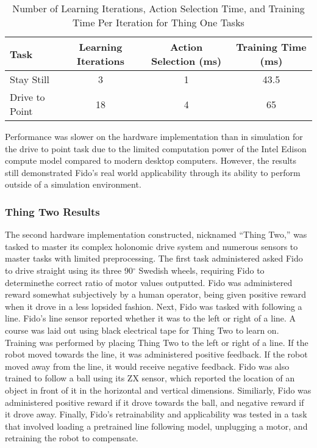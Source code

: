 \begin{table}[ht]
	\centering
	\begin{tabular}{@{}lccc@{}}
		\toprule
		Task             & Learning Iterations & Action Selection (ms) & Training Time (ms) \\ \midrule
		Stay Still       & 3                   & 1                    & 43.5                  \\
		Drive to Point   & 18                  & 4                     & 65                  \\
	\end{tabular}
	\caption{Number of Learning Iterations, Action Selection Time, and Training Time Per Iteration for Thing One Tasks}
	\label{tab:data2}
\end{table}

Performance was slower on the hardware implementation than in simulation for the drive to point task due to the limited computation power of the Intel Edison compute model compared to modern desktop computers.
However, the results still demonstrated Fido's real world applicability through its ability to perform outside of a simulation environment.

\subsubsection{Thing Two Results}

The second hardware implementation constructed, nicknamed ``Thing Two,'' was tasked to master its complex holonomic drive system and numerous sensors to master tasks with limited preprocessing.
The first task administered asked Fido to drive straight using its three 90$^{\circ}$ Swedish wheels, requiring Fido to determinethe correct ratio of motor values outputted.
Fido was administered reward somewhat subjectively by a human operator, being given positive reward when it drove in a less lopsided fashion.
Next, Fido was tasked with following a line.
Fido's line sensor reported whether it was to the left or right of a line.
A course was laid out using black electrical tape for Thing Two to learn on.
Training was performed by placing Thing Two to the left or right of a line.
If the robot moved towards the line, it was administered positive feedback.
If the robot moved away from the line, it would receive negative feedback.
Fido was also trained to follow a ball using its ZX sensor, which reported the location of an object in front of it in the horizontal and vertical dimensions.
Similiarly, Fido was administered positive reward if it drove towards the ball, and negative reward if it drove away.
Finally, Fido's retrainability and applicability was tested in a task that involved loading a pretrained line following model, unplugging a motor, and retraining the robot to compensate.

